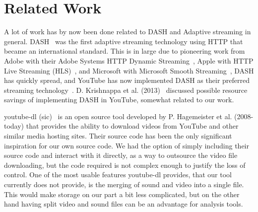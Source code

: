 \section{Related Work}
A lot of work has by now been done related to DASH and Adaptive streaming in
general. DASH~\cite{iso-dash-2014} was the first adaptive streaming
technology using HTTP that became an international standard. This is in large
due to pioneering work from Adobe with their Adobe Systems HTTP Dynamic
Streaming~\cite{adobe-http-dynamic-streaming}, Apple with HTTP Live Streaming
(HLS)~\cite{apple-http-streaming}, and Microsoft with Microsoft Smooth
Streaming~\cite{microsoft-smooth-streaming}, DASH has quickly spread, and
YouTube has now implemented DASH as their preferred streaming
technology~\cite{Google I/O 2013}. 
D. Krishnappa et al. (2013)~\cite{dashing-youtube} discussed possible resource
savings of implementing DASH in YouTube, somewhat related to our work. 

youtube-dl (sic)~\cite{youtube-dl} is an open source tool developed by P.
Hagemeister et al. (2008-today) that provides the ability to download videos
from YouTube and other similar media hosting sites. Their source code has been
the only significant inspiration for our own source code. We had the option of
simply including their source code and interact with it directly, as a way to
outsource the video file downloading, but the code required is not complex
enough to justify the loss of control. One of the most usable features
youtube-dl provides, that our tool currently does not provide, is the merging of
sound and video into a single file. This would make storage on our part a bit
less complicated, but on the other hand having split video and sound files can
be an advantage for analysis tools. 
